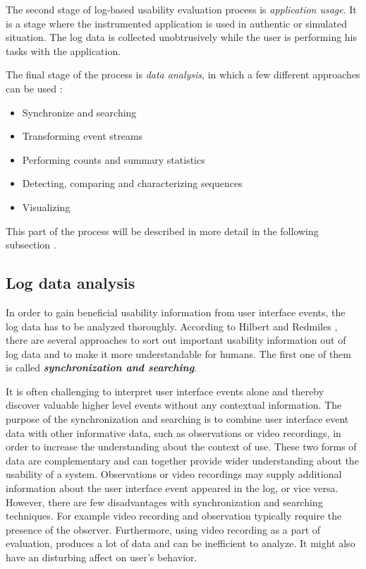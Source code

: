 \documentclass[12pt,a4paper,oneside,pdftex]{report}
\begin{document}
The second stage of log-based usability evaluation process is \emph{application usage}. It is a stage where the instrumented application is used in authentic or simulated situation. The log data is collected unobtrusively while the user is performing his tasks with the application. \cite{RefWorks:24}

The final stage of the process is \emph{data analysis}, in which a few different approaches can be used \cite{RefWorks:24, RefWorks:25}:
\begin{itemize}
  \item Synchronize and searching
  \item Transforming event streams
  \item Performing counts and summary statistics
  \item Detecting, comparing and characterizing sequences 
  \item Visualizing
\end{itemize}
This part of the process will be described in more detail in the following subsection .



\subsection{Log data analysis}
\label{sec:analysis}
 In order to gain beneficial usability information from user interface events, the log data has to be analyzed thoroughly. According to  Hilbert and Redmiles \cite{RefWorks:25}, there are several approaches to sort out important usability information out of log data and to make it more understandable for humans.
The first one of them is called \textbf{\emph{synchronization and searching}}. 

It is often challenging to interpret user interface events alone and thereby discover valuable higher level events without any contextual information. The purpose of the synchronization and searching is to combine user interface event data with other informative data, such as observations or video recordings, in order to increase the understanding about the context of use. These two forms of data are complementary and can together provide wider understanding about the usability of a system. Observations or video recordings may supply additional information about the user interface event appeared in the log, or vice versa. However, there are few disadvantages with synchronization and searching techniques. For example video recording and observation typically require the presence of the observer. Furthermore, using video recording as a part of evaluation, produces a lot of data and can be inefficient to analyze. It might also have an disturbing affect on user's behavior. \cite{RefWorks:25}
\end{document}
